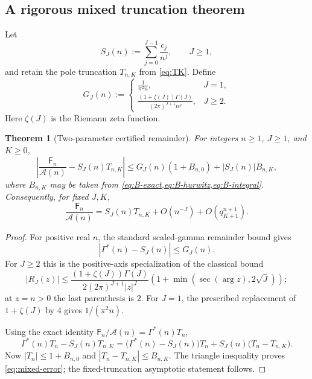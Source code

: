 \documentclass[11pt,a4paper,oneside]{article}
\newtheorem{theorem}{Theorem}[section]
\theoremstyle{definition}
\theoremstyle{remark}
\newcommand{\Fub}{\mathsf{F}}
\newcommand{\GammaStar}{\Gamma^{\!*}}
\begin{document}
\subsection{A rigorous mixed truncation theorem}
Let
\begin{equation}\label{eq:SJ}
 S_J(n):=\sum_{j=0}^{J-1}\frac{c_j}{n^j},
 \qquad J\ge1,
\end{equation}
and retain the pole truncation $T_{n,K}$ from \cref{eq:TK}.  Define
\begin{equation}\label{eq:GJ}
 G_J(n):=
 \begin{cases}
 \displaystyle\frac{1}{\pi^2n},&J=1,\\[2mm]
 \displaystyle\frac{(1+\zeta(J))\Gamma(J)}
 {(2\pi)^{J+1}n^J},&J\ge2.
 \end{cases}
\end{equation}
Here $\zeta(J)$ is the Riemann zeta function.

\begin{theorem}[Two-parameter certified remainder]\label{thm:mixed-error}
For integers $n\ge1$, $J\ge1$, and $K\ge0$,
\begin{equation}\label{eq:mixed-error}
 \left|\frac{\Fub_n}{\mathcal A(n)}-S_J(n)T_{n,K}\right|
 \le G_J(n)(1+B_{n,0})+|S_J(n)|B_{n,K},
\end{equation}
where $B_{n,K}$ may be taken from
\cref{eq:B-exact,eq:B-hurwitz,eq:B-integral}.  Consequently, for fixed
$J,K$,
\begin{equation}\label{eq:mixed-bigO}
 \frac{\Fub_n}{\mathcal A(n)}
 =S_J(n)T_{n,K}+O(n^{-J})
  +O\!\left(q_{K+1}^{n+1}\right).
\end{equation}
\end{theorem}

\begin{proof}
For positive real $n$, the standard scaled-gamma remainder bound
\cite[\S5.11(ii)]{DLMF} gives
\begin{equation}\label{eq:gammastar-bound}
 |\GammaStar(n)-S_J(n)|\le G_J(n).
\end{equation}
For $J\ge2$ this is the positive-axis specialization of the classical bound
\[
 |R_J(z)|\le
 \frac{(1+\zeta(J))\Gamma(J)}
 {2(2\pi)^{J+1}|z|^J}
 \left(1+\min(\sec(\arg z),2\sqrt J)\right);
\]
at $z=n>0$ the last parenthesis is $2$.  For $J=1$, the prescribed
replacement of $1+\zeta(J)$ by $4$ gives $1/(\pi^2n)$.

Using the exact identity $\Fub_n/\mathcal A(n)=\GammaStar(n)T_n$,
\[
 \GammaStar(n)T_n-S_J(n)T_{n,K}
 =\bigl(\GammaStar(n)-S_J(n)\bigr)T_n
  +S_J(n)\bigl(T_n-T_{n,K}\bigr).
\]
Now $|T_n|\le1+B_{n,0}$ and
$|T_n-T_{n,K}|\le B_{n,K}$.  The triangle inequality proves
\cref{eq:mixed-error}; the fixed-truncation asymptotic statement follows.
\end{proof}
\end{document}

